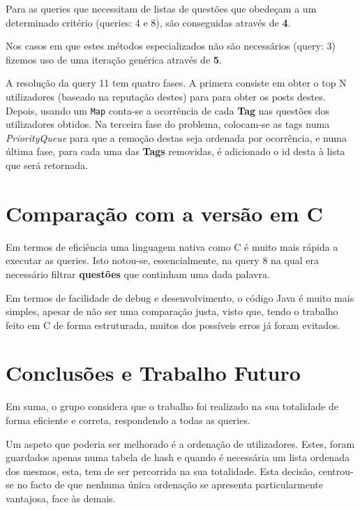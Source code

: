 \documentclass[10pt,a4paper]{report}
\begin{document}
    Para as queries que necessitam de listas de questões que obedeçam a um
    determinado critério (queries: 4 e 8), são conseguidas através de
    \textbf{4}.

    Nos casos em que estes métodos especializados não são necessários (query: 3)
    fizemos uso de uma iteração genérica através de \textbf{5}.

    A resolução da query 11 tem quatro fases. A primera consiste em obter o top
    N utilizadores (baseado na reputação destes) para para obter os posts
    destes.
    Depois, usando um \texttt{Map} conta-se a ocorrência de cada
    \textbf{Tag} nas questões dos utilizadores obtidos. Na terceira fase do
    problema, colocam-se as tags numa \textit{PriorityQueue} para que a
    remoção destas seja ordenada por ocorrência, e numa última fase, para cada
    uma das \textbf{Tags} removidas, é adicionado o id desta à lista que será
    retornada.

\chapter{Comparação com a versão em C}
    Em termos de eficiência uma linguagem nativa como C é muito mais rápida a
    executar as queries. Isto notou-se, essencialmente, na query 8 na qual era
    necessário filtrar \textbf{questões} que continham uma dada palavra.

    Em termos de facilidade de debug e desenvolvimento, o código Java é muito
    mais simples, apesar de não ser uma comparação justa, visto que, tendo o
    trabalho feito em C de forma estruturada, muitos dos possíveis erros já
    foram evitados.

\chapter{Conclusões e Trabalho Futuro}
    Em suma, o grupo considera que o trabalho foi realizado na sua
    totalidade de forma eficiente e correta, respondendo a todas as queries.

    Um aspeto que poderia ser melhorado é a ordenação de utilizadores. Estes,
    foram guardados apenas numa tabela de hash e quando é necessária um lista
    ordenada dos mesmos, esta, tem de ser percorrida na sua totalidade. Esta
    decisão, centrou-se no facto de que nenhuma única ordenação se apresenta
    particularmente vantajosa, face às demais.
\end{document}
